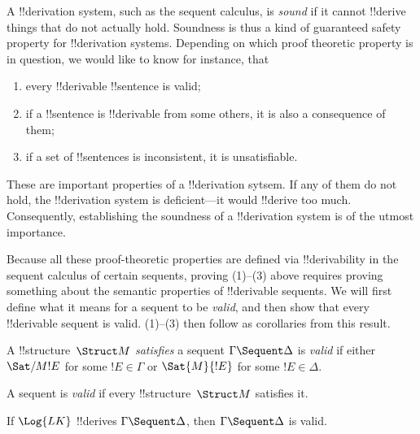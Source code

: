 \documentclass[../../include/open-logic-section]{subfiles}
\begin{document}

\begin{explain}
A !!{derivation} system, such as the sequent calculus, is \emph{sound}
if it cannot !!{derive} things that do not actually hold.  Soundness is
thus a kind of guaranteed safety property for !!{derivation} systems.
Depending on which proof theoretic property is in question, we would
like to know for instance, that
\begin{enumerate}
\item every !!{derivable} !!{sentence} is valid;
\item if a !!{sentence} is !!{derivable} from some others, it is also a
  consequence of them;
\item if a set of !!{sentence}s is inconsistent, it is unsatisfiable.
\end{enumerate}
These are important properties of a !!{derivation} sytsem.  If any of them do
not hold, the !!{derivation} system is deficient---it would !!{derive} too much.
Consequently, establishing the soundness of a !!{derivation} system is of the
utmost importance.

Because all these proof-theoretic properties are
defined via !!{derivability} in the sequent calculus of certain sequents,
proving (1)--(3) above requires proving something about the semantic
properties of !!{derivable} sequents.  We will first define what it means
for a sequent to be \emph{valid}, and then show that every !!{derivable}
sequent is valid.  (1)--(3) then follow as corollaries from this
result.
\end{explain}

\begin{defn}
A !!{structure}~$\Struct M$ \emph{satisfies} a sequent $\Gamma
\Sequent \Delta$ is \emph{valid} if either $\Sat/{M}{!E}$ for some $!E
\in \Gamma$ or $\Sat{M}{!E}$ for some $!E \in \Delta$.

A sequent is \emph{valid} if every !!{structure}~$\Struct M$ satisfies
it.
\end{defn}

\begin{thm}[Soundness]
 If $\Log{LK}$ !!{derive}s $\Gamma \Sequent
\Delta$, then $\Gamma \Sequent \Delta$ is valid.
\end{thm}
\end{document}
